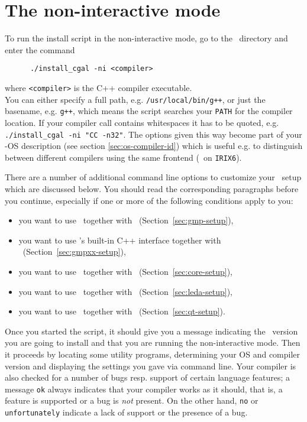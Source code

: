 \section{The non-interactive mode}\label{sec:non-interactive}

To run the install script in the non-interactive mode, go to the
\cgaldir\ directory and enter the command
\begin{verbatim}
      ./install_cgal -ni <compiler>
\end{verbatim}
where \texttt{<compiler>} is the C++ compiler
executable.\\ You can either specify a full
path, e.g. \texttt{/usr/local/bin/g++}, or just the basename, e.g.
\texttt{g++}, which means the script searches your \texttt{PATH} for
the compiler location. If your compiler call contains whitespaces it
has to be quoted, e.g.  \texttt{./install\_cgal -ni "CC -n32"}.  The
options given this way become part of your \cgal-OS
description (see section
\ref{sec:os-compiler-id}) which is useful e.g. to distinguish between
different compilers using the same frontend (\mipsprocc\ on
\texttt{IRIX6}).

There are a number of additional command line options to customize
your \cgal\ setup which are discussed below. You should read the
corresponding paragraphs before you continue, especially if one or
more of the following conditions apply to you:
\begin{itemize}
\item you want to use \gmp\ together with \cgal\ 
  (Section~\ref{sec:gmp-setup}),
\item you want to use \gmp's built-in C++ interface together with
  \cgal\ (Section~\ref{sec:gmpxx-setup}),
\item you want to use \core\ together with \cgal\ 
  (Section~\ref{sec:core-setup}),
\item you want to use \leda\ together with \cgal\ 
  (Section~\ref{sec:leda-setup}),
\item you want to use \qt\ together with \cgal\ 
  (Section~\ref{sec:qt-setup}).
\end{itemize}

Once you started the script, it should give you a message indicating
the \cgal\ version you are going to install and that you are running
the non-interactive mode. Then it proceeds by locating some utility
programs, determining your OS and compiler version and displaying the
settings you gave via command line. Your compiler is also checked for
a number of bugs resp. support of certain language features; a message
\texttt{ok} always indicates that your compiler works as it should,
that is, a feature is supported or a bug is \textit{not} present. On
the other hand, \texttt{no} or \texttt{unfortunately} indicate a lack
of support or the presence of a bug.

